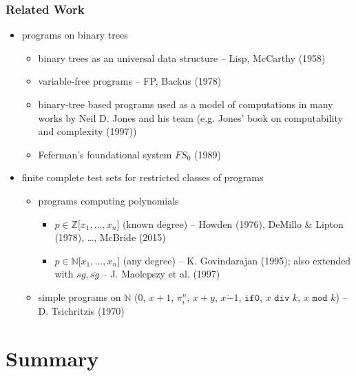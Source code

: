 \documentclass{beamer}
\begin{document}
\begin{frame}
  \frametitle{Related Work}
  \begin{itemize}
    \item programs on binary trees
	  \begin{itemize}
	    \item binary trees as an universal data structure -- Lisp, McCarthy (1958)
	    \item variable-free programs -- FP, Backus (1978)
	    \item binary-tree based programs used as a model of computations in 
	      many works by Neil D. Jones and his team (e.g. Jones' book 
	      on computability and complexity (1997))
	    \item Feferman's foundational system $FS_0$ (1989)
	  \end{itemize}
	\item finite complete test sets for restricted classes of programs
	  \begin{itemize}
	    \item programs computing polynomials
	      \begin{itemize}
	        \item $p \in \mathbb{Z}\lbrack x_1, \ldots, x_n\rbrack$ (known degree) --
	          Howden (1976), DeMillo \& Lipton (1978), \ldots, McBride (2015)
	        \item $p \in \mathbb{N}\lbrack x_1, \ldots, x_n\rbrack$ (any degree) --
	          K. Govindarajan (1995); 
	          also extended with $\mathit{sg}, \overline{\mathit{sg}}$ --
	          J. Maolepszy et al. (1997)
	      \end{itemize}
	    \item simple programs on $\mathbb{N}$ 
	      ($0$, $x+1$, $\pi^n_i$, $x+y$, $x\dot{-}1$, $\texttt{if0}$, $x \texttt{ div } k$, $x \texttt{ mod } k$)
	      -- D. Tsichritzis (1970)
	  \end{itemize}
  \end{itemize}
\end{frame}

\section*{Summary}
\end{document}
